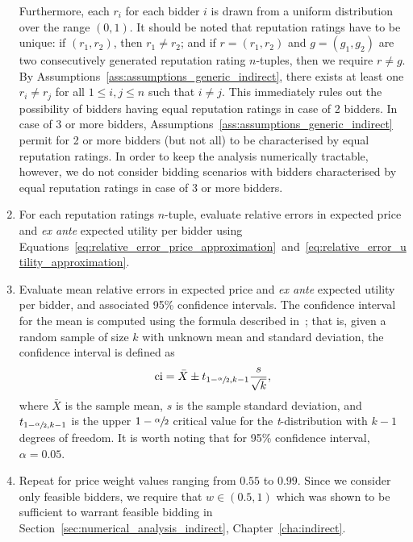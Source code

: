 \begin{enumerate}
Furthermore, each $r_i$ for each bidder $i$ is drawn from a uniform distribution over the range $(0,1)$. It should be noted that reputation ratings have to be unique: if $(r_1,r_2)$, then $r_1\neq r_2$; and if $r=(r_1,r_2)$ and $g=(g_1,g_2)$ are two consecutively generated reputation rating $n$-tuples, then we require $r \neq g$. By Assumptions~\ref{ass:assumptions_generic_indirect}, there exists at least one $r_i\neq r_j$ for all $1\leq i,j\leq n$ such that $i\neq j$. This immediately rules out the possibility of bidders having equal reputation ratings in case of 2 bidders. In case of 3 or more bidders, Assumptions~\ref{ass:assumptions_generic_indirect} permit for 2 or more bidders (but not all) to be characterised by equal reputation ratings. In order to keep the analysis numerically tractable, however, we do not consider bidding scenarios with bidders characterised by equal reputation ratings in case of 3 or more bidders.
\item For each reputation ratings $n$-tuple, evaluate relative errors in expected price and \emph{ex ante} expected utility per bidder using Equations~\eqref{eq:relative_error_price_approximation}~and~\eqref{eq:relative_error_utility_approximation}.
\item Evaluate mean relative errors in expected price and \emph{ex ante} expected utility per bidder, and associated 95\% confidence intervals. The confidence interval for the mean is computed using the formula described in~\cite{LawChapter42007}; that is, given a random sample of size $k$ with unknown mean and standard deviation, the confidence interval is defined as
\begin{equation*}
  \text{ci}=\bar{X}\pm t_{1-\sfrac{\alpha}{2},k-1}\frac{s}{\sqrt{k}},
\end{equation*}
where $\bar{X}$ is the sample mean, $s$ is the sample standard deviation, and $t_{1-\sfrac{\alpha}{2}, k-1}$ is the upper $1-\sfrac{\alpha}{2}$ critical value for the \emph{t}-distribution with $k-1$ degrees of freedom. It is worth noting that for 95\% confidence interval, $\alpha=0.05$.
\item Repeat for price weight values ranging from $0.55$ to $0.99$. Since we consider only feasible bidders, we require that $w\in(0.5,1)$ which was shown to be sufficient to warrant feasible bidding in Section~\ref{sec:numerical_analysis_indirect}, Chapter~\ref{cha:indirect}.
\end{enumerate}

